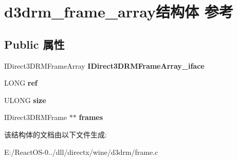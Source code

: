 \hypertarget{structd3drm__frame__array}{}\section{d3drm\+\_\+frame\+\_\+array结构体 参考}
\label{structd3drm__frame__array}
\subsection*{Public 属性}
\begin{DoxyCompactItemize}
\item 
\mbox{\label{structd3drm__frame__array_a3a102e4a3092f126cdcbee5b981c35ee}} 
I\+Direct3\+D\+R\+M\+Frame\+Array {\bfseries I\+Direct3\+D\+R\+M\+Frame\+Array\+\_\+iface}
\item 
\mbox{\label{structd3drm__frame__array_ae6f1b523432eda815b7133626e9a1afc}} 
L\+O\+NG {\bfseries ref}
\item 
\mbox{\label{structd3drm__frame__array_a5ab4d3cea24af881fc97026e393d2d25}} 
U\+L\+O\+NG {\bfseries size}
\item 
\mbox{\label{structd3drm__frame__array_a12cbcbc656f2fa104cc44cbbbc80845f}} 
I\+Direct3\+D\+R\+M\+Frame $\ast$$\ast$ {\bfseries frames}
\end{DoxyCompactItemize}


该结构体的文档由以下文件生成\+:\begin{DoxyCompactItemize}
\item 
E\+:/\+React\+O\+S-\/0../dll/directx/wine/d3drm/frame.\+c\end{DoxyCompactItemize}
